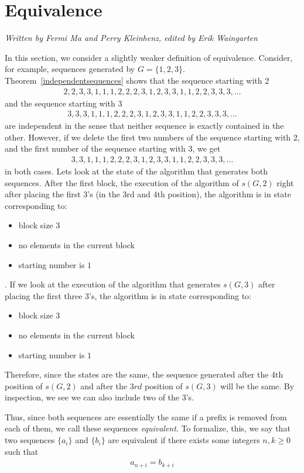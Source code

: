 \documentclass[runningheads,a4paper]{llncs}
\begin{document}
\section{Equivalence}
\label{equivalence}
\emph{Written by Fermi Ma and Perry Kleinhenz, edited by Erik Waingarten}

In this section, we consider a slightly weaker definition of equivalence. Consider, for example, sequences generated by $G = \{1,2,3\}$. Theorem~\ref{independentsequences} shows that the sequence starting with 2
\begin{align*}
2,2,3,3,1,1,1,2,2,2,3,1,2,3,3,1,1,2,2,3,3,3,\dots
\end{align*}
and the sequence starting with 3
\begin{align*}
3,3,3,1,1,1,2,2,2,3,1,2,3,3,1,1,2,2,3,3,3,\dots
\end{align*}
are independent in the sense that neither sequence is exactly contained in the other. However, if we delete the first two numbers of the sequence starting with 2, and the first number of the sequence starting with 3, we get 
\begin{align*}
3,3,1,1,1,2,2,2,3,1,2,3,3,1,1,2,2,3,3,3,\dots
\end{align*}
in both cases. Lets look at the state of the algorithm that generates both sequences. After the first block, the execution of the algorithm of $s(G, 2)$ right after placing the first $3$'s (in the 3rd and 4th position), the algorithm is in state corresponding to:
\begin{itemize}
\item block size $3$
\item no elements in the current block
\item starting number is $1$
\end{itemize}.   
If we look at the execution of the algorithm that generates $s(G, 3)$ after placing the first three $3$'s, the algorithm is in state corresponding to:
\begin{itemize}
\item block size $3$
\item no elements in the current block
\item starting number is $1$
\end{itemize}
Therefore, since the states are the same, the sequence generated after the 4th position of $s(G, 2)$ and after the $3rd$ position of $s(G, 3)$ will be the same. By inspection, we see we can also include two of the 3's.

Thus, since both sequences are essentially the same if a prefix is removed from each of them, we call these sequences \emph{equivalent}. To formalize, this, we say that two sequences $\{a_i\}$ and $\{b_i\}$ are equivalent if there exists some integers $n,k \geq 0$ such that
\begin{align*}
a_{n+i} = b_{k+i}
\end{align*}
\end{document}
